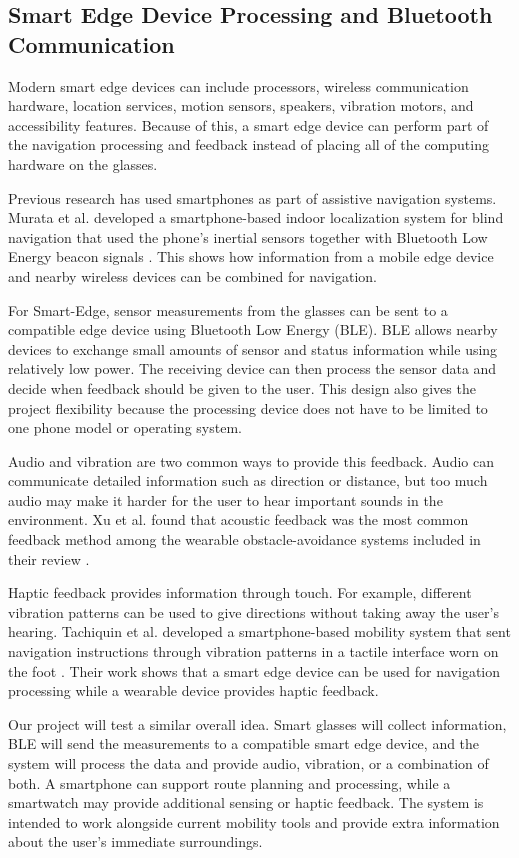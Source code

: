 \documentclass[12pt,letterpaper,oneside,reqno]{book}
\theoremstyle{plain}
\theoremstyle{definition}
\theoremstyle{plain}
\theoremstyle{remark}
\theoremstyle{plain}
\theoremstyle{definition}
\theoremstyle{plain}
\begin{document}
\subsection{Smart Edge Device Processing and Bluetooth Communication}
Modern smart edge devices can include processors, wireless communication hardware, location services, motion sensors, speakers, vibration motors, and accessibility features. Because of this, a smart edge device can perform part of the navigation processing and feedback instead of placing all of the computing hardware on the glasses.

Previous research has used smartphones as part of assistive navigation systems. Murata et al. developed a smartphone-based indoor localization system for blind navigation that used the phone's inertial sensors together with Bluetooth Low Energy beacon signals \cite{Murata2019}. This shows how information from a mobile edge device and nearby wireless devices can be combined for navigation.

For Smart-Edge, sensor measurements from the glasses can be sent to a compatible edge device using Bluetooth Low Energy (BLE). BLE allows nearby devices to exchange small amounts of sensor and status information while using relatively low power. The receiving device can then process the sensor data and decide when feedback should be given to the user. This design also gives the project flexibility because the processing device does not have to be limited to one phone model or operating system.

Audio and vibration are two common ways to provide this feedback. Audio can communicate detailed information such as direction or distance, but too much audio may make it harder for the user to hear important sounds in the environment. Xu et al. found that acoustic feedback was the most common feedback method among the wearable obstacle-avoidance systems included in their review \cite{Xu2023}.

Haptic feedback provides information through touch. For example, different vibration patterns can be used to give directions without taking away the user's hearing. Tachiquin et al. developed a smartphone-based mobility system that sent navigation instructions through vibration patterns in a tactile interface worn on the foot \cite{Tachiquin2021}. Their work shows that a smart edge device can be used for navigation processing while a wearable device provides haptic feedback.

Our project will test a similar overall idea. Smart glasses will collect information, BLE will send the measurements to a compatible smart edge device, and the system will process the data and provide audio, vibration, or a combination of both. A smartphone can support route planning and processing, while a smartwatch may provide additional sensing or haptic feedback. The system is intended to work alongside current mobility tools and provide extra information about the user's immediate surroundings.
\end{document}
